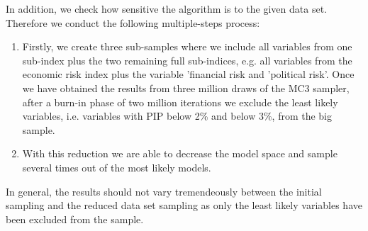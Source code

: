 \documentclass{article}
\begin{document}
In addition, we check how sensitive the algorithm is to the given data set. Therefore we conduct the following multiple-steps process:
\begin{enumerate}
    \item Firstly, we create three sub-samples where we include all variables from one sub-index plus the two remaining full sub-indices, e.g. all variables from the economic risk index plus the variable 'financial risk and 'political risk'. Once we have obtained the results from three million draws of the MC3 sampler, after a burn-in phase of two million iterations we exclude the least likely variables, i.e. variables with PIP below 2\% and below 3\%, from the big sample. 
    \item With this reduction we are able to decrease the model space and sample several times out of the most likely models. 
\end{enumerate}
In general, the results should not vary tremendeously between the initial sampling and the reduced data set sampling as only the least likely variables have been excluded from the sample.\\
\end{document}
